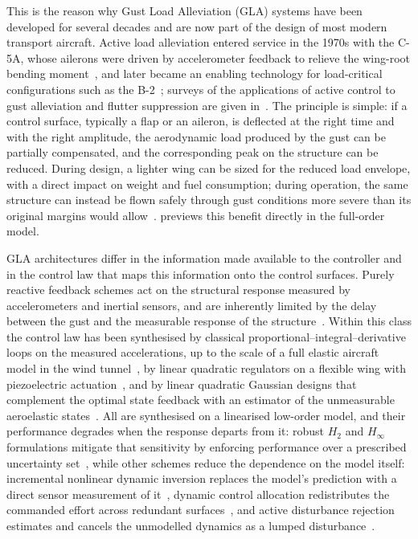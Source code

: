 This is the reason why Gust Load Alleviation (GLA) systems have been developed for several decades and are now part of the design of most modern transport aircraft. Active load alleviation entered service in the 1970s with the C-5A, whose ailerons were driven by accelerometer feedback to relieve the wing-root bending moment~\cite{disney1977c5a}, and later became an enabling technology for load-critical configurations such as the B-2~\cite{britt2000b2}; surveys of the applications of active control to gust alleviation and flutter suppression are given in~\cite{regan2012survey,GLA_review}. The principle is simple: if a control surface, typically a flap or an aileron, is deflected at the right time and with the right amplitude, the aerodynamic load produced by the gust can be partially compensated, and the corresponding peak on the structure can be reduced. During design, a lighter wing can be sized for the reduced load envelope, with a direct impact on weight and fuel consumption; during operation, the same structure can instead be flown safely through gust conditions more severe than its original margins would allow~\cite{regan2012survey}.  previews this benefit directly in the full-order model.

GLA architectures differ in the information made available to the controller and in the control law that maps this information onto the control surfaces. Purely reactive feedback schemes act on the structural response measured by accelerometers and inertial sensors, and are inherently limited by the delay between the gust and the measurable response of the structure~\cite{regan2012survey}. Within this class the control law has been synthesised by classical proportional--integral--derivative loops on the measured accelerations, up to the scale of a full elastic aircraft model in the wind tunnel~\cite{zhao2023windtunnel}, by linear quadratic regulators on a flexible wing with piezoelectric actuation~\cite{versiani2019smartwing}, and by linear quadratic Gaussian designs that complement the optimal state feedback with an estimator of the unmeasurable aeroelastic states~\cite{duessler2023lqg}. All are synthesised on a linearised low-order model, and their performance degrades when the response departs from it: robust $H_2$ and $H_\infty$ formulations mitigate that sensitivity by enforcing performance over a prescribed uncertainty set~\cite{ting2023preview,he2023robust}, while other schemes reduce the dependence on the model itself: incremental nonlinear dynamic inversion replaces the model's prediction with a direct sensor measurement of it~\cite{wang2019indi}, dynamic control allocation redistributes the commanded effort across redundant surfaces~\cite{hansen2022allocation}, and active disturbance rejection estimates and cancels the unmodelled dynamics as a lumped disturbance~\cite{yue2023adrc}.

